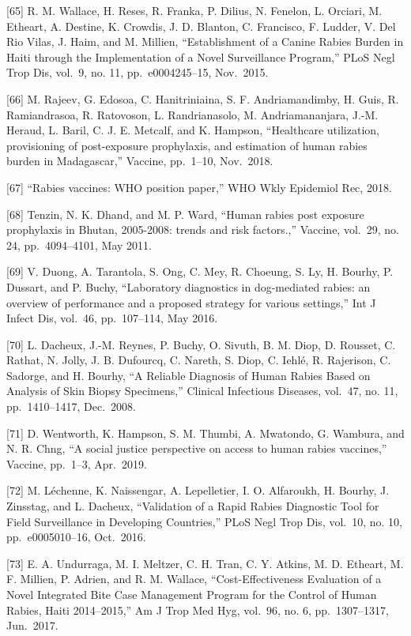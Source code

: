 \documentclass[
]{book}
\begin{document}
{[}65{]} R. M. Wallace, H. Reses, R. Franka, P. Dilius, N. Fenelon, L. Orciari, M. Etheart, A. Destine, K. Crowdis, J. D. Blanton, C. Francisco, F. Ludder, V. Del Rio Vilas, J. Haim, and M. Millien, ``Establishment of a Canine Rabies Burden in Haiti through the Implementation of a Novel Surveillance Program,'' PLoS Negl Trop Dis, vol.~9, no. 11, pp.~e0004245--15, Nov.~2015.

{[}66{]} M. Rajeev, G. Edosoa, C. Hanitriniaina, S. F. Andriamandimby, H. Guis, R. Ramiandrasoa, R. Ratovoson, L. Randrianasolo, M. Andriamananjara, J.-M. Heraud, L. Baril, C. J. E. Metcalf, and K. Hampson, ``Healthcare utilization, provisioning of post-exposure prophylaxis, and estimation of human rabies burden in Madagascar,'' Vaccine, pp.~1--10, Nov.~2018.

{[}67{]} ``Rabies vaccines: WHO position paper,'' WHO Wkly Epidemiol Rec, 2018.

{[}68{]} Tenzin, N. K. Dhand, and M. P. Ward, ``Human rabies post exposure prophylaxis in Bhutan, 2005-2008: trends and risk factors.,'' Vaccine, vol.~29, no. 24, pp.~4094--4101, May 2011.

{[}69{]} V. Duong, A. Tarantola, S. Ong, C. Mey, R. Choeung, S. Ly, H. Bourhy, P. Dussart, and P. Buchy, ``Laboratory diagnostics in dog-mediated rabies: an overview of performance and a proposed strategy for various settings,'' Int J Infect Dis, vol.~46, pp.~107--114, May 2016.

{[}70{]} L. Dacheux, J.-M. Reynes, P. Buchy, O. Sivuth, B. M. Diop, D. Rousset, C. Rathat, N. Jolly, J. B. Dufourcq, C. Nareth, S. Diop, C. Iehlé, R. Rajerison, C. Sadorge, and H. Bourhy, ``A Reliable Diagnosis of Human Rabies Based on Analysis of Skin Biopsy Specimens,'' Clinical Infectious Diseases, vol.~47, no. 11, pp.~1410--1417, Dec.~2008.

{[}71{]} D. Wentworth, K. Hampson, S. M. Thumbi, A. Mwatondo, G. Wambura, and N. R. Chng, ``A social justice perspective on access to human rabies vaccines,'' Vaccine, pp.~1--3, Apr.~2019.

{[}72{]} M. Léchenne, K. Naissengar, A. Lepelletier, I. O. Alfaroukh, H. Bourhy, J. Zinsstag, and L. Dacheux, ``Validation of a Rapid Rabies Diagnostic Tool for Field Surveillance in Developing Countries,'' PLoS Negl Trop Dis, vol.~10, no. 10, pp.~e0005010--16, Oct.~2016.

{[}73{]} E. A. Undurraga, M. I. Meltzer, C. H. Tran, C. Y. Atkins, M. D. Etheart, M. F. Millien, P. Adrien, and R. M. Wallace, ``Cost-Effectiveness Evaluation of a Novel Integrated Bite Case Management Program for the Control of Human Rabies, Haiti 2014--2015,'' Am J Trop Med Hyg, vol.~96, no. 6, pp.~1307--1317, Jun.~2017.
\end{document}
